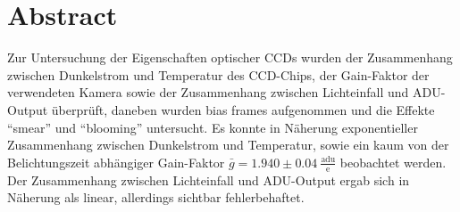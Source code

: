 \section{Abstract}
Zur Untersuchung der Eigenschaften optischer CCDs wurden der Zusammenhang zwischen Dunkelstrom und Temperatur des CCD-Chips, der Gain-Faktor der verwendeten Kamera sowie der Zusammenhang zwischen Lichteinfall und ADU-Output überprüft, daneben wurden bias frames aufgenommen und die Effekte \enquote{smear} und \enquote{blooming} untersucht. Es konnte in Näherung exponentieller Zusammenhang zwischen Dunkelstrom und Temperatur, sowie ein kaum von der Belichtungszeit abhängiger Gain-Faktor $\bar{g} = 1.940 \pm 0.04 \ \frac{\mathrm{adu}}{\mathrm{e}}$ beobachtet werden. Der Zusammenhang zwischen Lichteinfall und ADU-Output ergab sich in Näherung als linear, allerdings sichtbar fehlerbehaftet. 